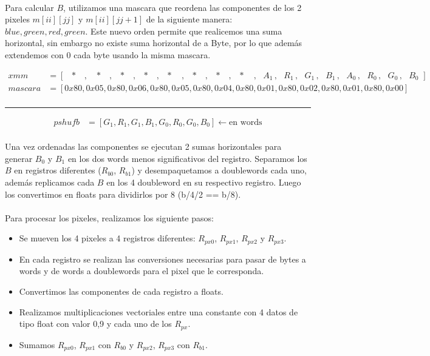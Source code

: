 \documentclass[a4paper]{article}
\begin{document}
\paragraph{}Para calcular $B$, utilizamos una mascara que reordena las componentes de los 2 pixeles $m[ii][jj]$ y $m[ii][jj+1]$ de la siguiente manera: $blue, green, red, green$. Este nuevo orden permite que realicemos una suma horizontal, sin embargo no existe suma horizontal de a Byte, por lo que adem\'as extendemos con 0 cada byte usando la misma mascara.  

\begin{align*}
	xmm &= [\, \, \, \, * \, \, \, \, \, ,\, \, \, \, \, * \, \, \, \, \, ,\, \, \, \, * \, \, \, \, \, ,\, \, \, \, * \, \, \, \, \, ,\, \, \, \, * \, \, \, \, \, \, ,\, \, \, \, * \, \, \, \, \, ,\, \, \, \, * \, \, \, \, \, ,\, \, \, \, * \, \, \, \, \, \, , \, \, \, \,  A_1 \, , \, \, \, \, R_1 \, , \, \, \, \, G_1 \, , \, \, \, \, B_1 \, , \, \, \, \, A_0 \, , \, \, \, \, R_0 \, , \, \, \, \, G_0 \, , \, \, \, \, B_0 \, \,]\\
	mascara &= [0x80, 0x05, 0x80, 0x06, 0x80, 0x05, 0x80, 0x04, 0x80, 0x01, 0x80, 0x02, 0x80, 0x01, 0x80, 0x00] \\
\end{align*}
	\hrule
\begin{align*}
	pshufb &= [G_1, R_1, G_1, B_1, G_0, R_0, G_0, B_0] \leftarrow \text{en words}
\end{align*} 

\paragraph{}Una vez ordenadas las componentes se ejecutan 2 sumas horizontales para generar $B_0$ y $B_1$ en los dos words menos significativos del registro. Separamos los $B$ en registros diferentes ($R_{b0}$, $R_{b1}$) y desempaquetamos a doublewords cada uno, adem\'as replicamos cada $B$ en los 4 doubleword en su respectivo registro. Luego los convertimos en floats para dividirlos por 8 (b/4/2 == b/8).

\paragraph{} Para procesar los pixeles, realizamos los siguiente pasos:

\begin{itemize}
	\item Se mueven los 4 pixeles a 4 registros diferentes: $R_{px0}$, $R_{px1}$, $R_{px2}$ y $R_{px3}$.
	\item En cada registro se realizan las conversiones necesarias para pasar de bytes a words y de words a doublewords para el pixel que le corresponda.
	\item Convertimos las componentes de cada registro a floats.
	\item Realizamos multiplicaciones vectoriales entre una constante con 4 datos de tipo float con valor 0,9 y cada uno de los $R_{px}$.
	\item Sumamos $R_{px0}$, $R_{px1}$ con $R_{b0}$ y $R_{px2}$, $R_{px3}$ con $R_{b1}$.
\end{itemize}
\end{document}
